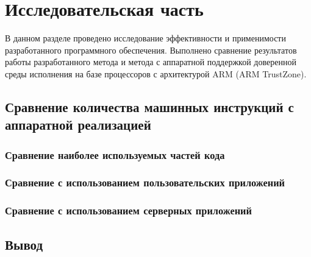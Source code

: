 \section{Исследовательская часть}

В данном разделе проведено исследование эффективности и применимости разработанного программного обеспечения. Выполнено сравнение результатов работы разработанного метода и метода с аппаратной поддержкой доверенной среды исполнения на базе процессоров с архитектурой ARM (ARM TrustZone).

\subsection{Сравнение количества машинных инструкций с аппаратной реализацией}

\subsubsection{Сравнение наиболее используемых частей кода}

\subsubsection{Сравнение с использованием пользовательских приложений}

\subsubsection{Сравнение с использованием серверных приложений}

\subsection*{Вывод}

\pagebreak
